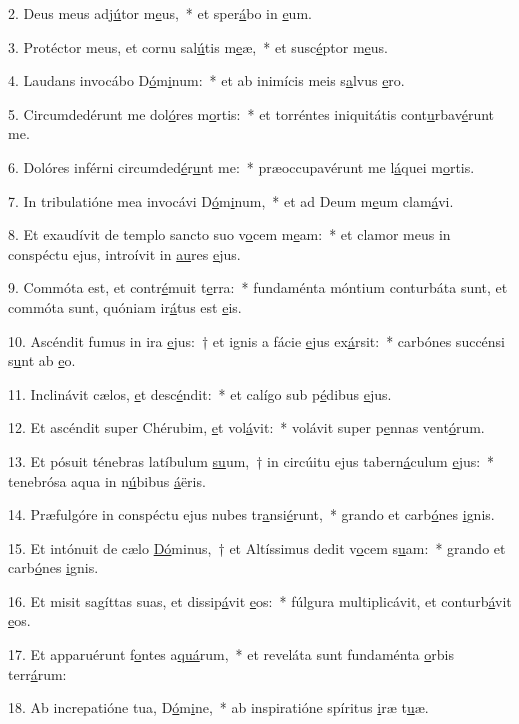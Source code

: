 2. Deus meus adj\uline{ú}tor m\uline{e}us,~* et sper\uline{á}bo in \uline{e}um.\par 
3. Protéctor meus, et cornu sal\uline{ú}tis m\uline{e}æ,~* et susc\uline{é}ptor m\uline{e}us.\par 
4. Laudans invocábo D\uline{ó}m\uline{i}num:~* et ab inimícis meis s\uline{a}lvus \uline{e}ro.\par 
5. Circumdedérunt me dol\uline{ó}res m\uline{o}rtis:~* et torréntes iniquitátis cont\uline{u}rbav\uline{é}runt me.\par 
6. Dolóres inférni circumded\uline{é}r\uline{u}nt me:~* præoccupavérunt me l\uline{á}quei m\uline{o}rtis.\par 
7. In tribulatióne mea invocávi D\uline{ó}m\uline{i}num,~* et ad Deum m\uline{e}um clam\uline{á}vi.\par 
8. Et exaudívit de templo sancto suo v\uline{o}cem m\uline{e}am:~* et clamor meus in conspéctu ejus, introívit in \uline{au}res \uline{e}jus.\par 
9. Commóta est, et contr\uline{é}muit t\uline{e}rra:~* fundaménta móntium conturbáta sunt, et commóta sunt, quóniam ir\uline{á}tus est \uline{e}is.\par 
10. Ascéndit fumus in ira \uline{e}jus:~† et ignis a fácie \uline{e}jus ex\uline{á}rsit:~* carbónes succénsi s\uline{u}nt ab \uline{e}o.\par 
11. Inclinávit cælos, \uline{e}t desc\uline{é}ndit:~* et calígo sub p\uline{é}dibus \uline{e}jus.\par 
12. Et ascéndit super Chérubim, \uline{e}t vol\uline{á}vit:~* volávit super p\uline{e}nnas vent\uline{ó}rum.\par 
13. Et pósuit ténebras latíbulum \uline{su}um,~† in circúitu ejus tabern\uline{á}culum \uline{e}jus:~* tenebrósa aqua in n\uline{ú}bibus \uline{á}ëris.\par 
14. Præfulgóre in conspéctu ejus nubes tr\uline{a}nsi\uline{é}runt,~* grando et carb\uline{ó}nes \uline{i}gnis.\par 
15. Et intónuit de cælo \uline{Dó}minus,~† et Altíssimus dedit v\uline{o}cem s\uline{u}am:~* grando et carb\uline{ó}nes \uline{i}gnis.\par 
16. Et misit sagíttas suas, et dissip\uline{á}vit \uline{e}os:~* fúlgura multiplicávit, et conturb\uline{á}vit \uline{e}os.\par 
17. Et apparuérunt f\uline{o}ntes a\uline{quá}rum,~* et reveláta sunt fundaménta \uline{o}rbis terr\uline{á}rum:\par 
18. Ab increpatióne tua, D\uline{ó}m\uline{i}ne,~* ab inspiratióne spíritus \uline{i}ræ t\uline{u}æ.\par 
